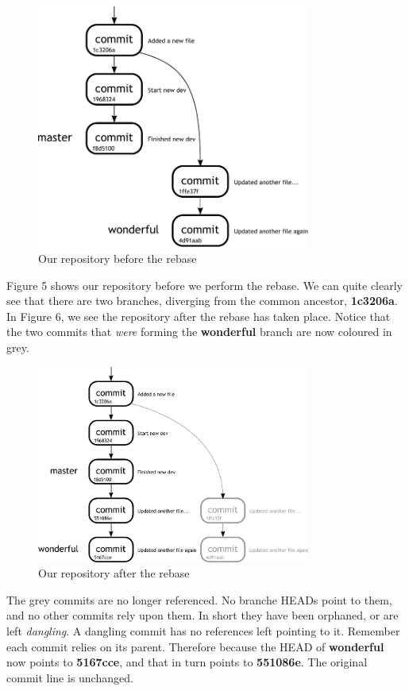 \begin{figure}[hbt]
\centering
\includegraphics[width=9cm]{images/f-w7-d5.pdf}
\caption{Our repository before the rebase}
\end{figure}

Figure 5 shows our repository before we perform the rebase.  We can quite clearly see that there are two branches, diverging from the common ancestor, \textbf{1c3206a}.  In Figure 6, we see the repository after the rebase has taken place.  Notice that the two commits that \emph{were} forming the \textbf{wonderful} branch are now coloured in grey.

\begin{figure}[hbt]
\centering
\includegraphics[width=9cm]{images/f-w7-d6.pdf}
\caption{Our repository after the rebase}
\end{figure}

The grey commits are no longer referenced.  No branche HEADs point to them, and no other commits rely upon them.  In short they have been orphaned, or are left \emph{dangling}.  A dangling commit has no references left pointing to it.  Remember each commit relies on its parent.  Therefore because the HEAD of \textbf{wonderful} now points to \textbf{5167cce}, and that in turn points to \textbf{551086e}.  The original commit line is unchanged.

